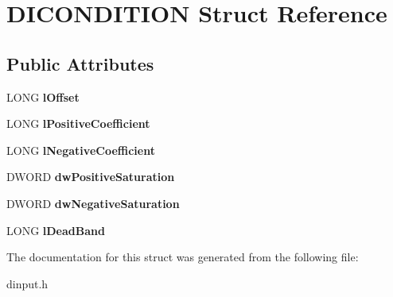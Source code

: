 \hypertarget{struct_d_i_c_o_n_d_i_t_i_o_n}{\section{D\-I\-C\-O\-N\-D\-I\-T\-I\-O\-N Struct Reference}
\label{struct_d_i_c_o_n_d_i_t_i_o_n}
}
\subsection*{Public Attributes}
\begin{DoxyCompactItemize}
\item 
\hypertarget{struct_d_i_c_o_n_d_i_t_i_o_n_a093288dba736d9c48f725d6ad547e21f}{L\-O\-N\-G {\bfseries l\-Offset}}\label{struct_d_i_c_o_n_d_i_t_i_o_n_a093288dba736d9c48f725d6ad547e21f}

\item 
\hypertarget{struct_d_i_c_o_n_d_i_t_i_o_n_a868c8158f884abc8ee3b10cd4c5e608e}{L\-O\-N\-G {\bfseries l\-Positive\-Coefficient}}\label{struct_d_i_c_o_n_d_i_t_i_o_n_a868c8158f884abc8ee3b10cd4c5e608e}

\item 
\hypertarget{struct_d_i_c_o_n_d_i_t_i_o_n_a493c1cf39114314318be0fbea6f7d3a8}{L\-O\-N\-G {\bfseries l\-Negative\-Coefficient}}\label{struct_d_i_c_o_n_d_i_t_i_o_n_a493c1cf39114314318be0fbea6f7d3a8}

\item 
\hypertarget{struct_d_i_c_o_n_d_i_t_i_o_n_a0fd65390fbd1c57fec0b24f92d280d23}{D\-W\-O\-R\-D {\bfseries dw\-Positive\-Saturation}}\label{struct_d_i_c_o_n_d_i_t_i_o_n_a0fd65390fbd1c57fec0b24f92d280d23}

\item 
\hypertarget{struct_d_i_c_o_n_d_i_t_i_o_n_a38850774c36815979f3e6ae443984b22}{D\-W\-O\-R\-D {\bfseries dw\-Negative\-Saturation}}\label{struct_d_i_c_o_n_d_i_t_i_o_n_a38850774c36815979f3e6ae443984b22}

\item 
\hypertarget{struct_d_i_c_o_n_d_i_t_i_o_n_ab926e8ea4ee58d043368cc74dc61333a}{L\-O\-N\-G {\bfseries l\-Dead\-Band}}\label{struct_d_i_c_o_n_d_i_t_i_o_n_ab926e8ea4ee58d043368cc74dc61333a}

\end{DoxyCompactItemize}


The documentation for this struct was generated from the following file\-:\begin{DoxyCompactItemize}
\item 
dinput.\-h\end{DoxyCompactItemize}
